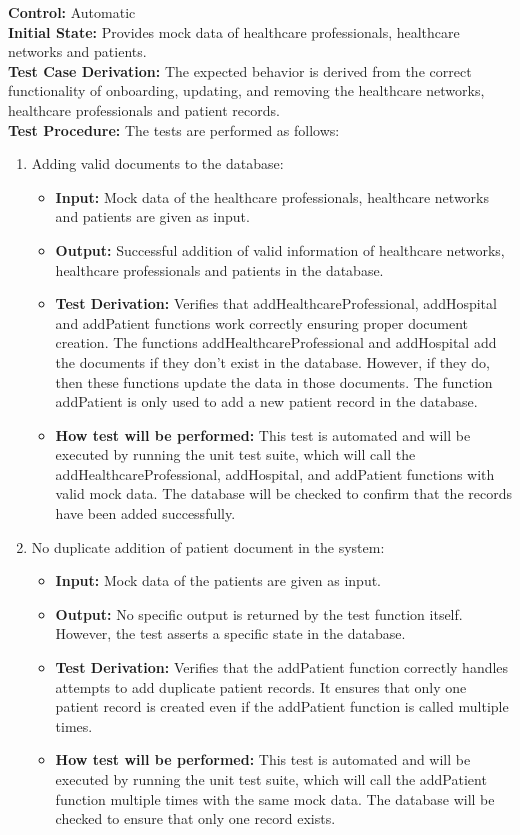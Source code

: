 \documentclass[12pt, titlepage]{article}
\begin{document}
\textbf{Control:} Automatic\\ 
\textbf{Initial State:} Provides mock data of healthcare professionals, healthcare networks and patients.\\ 
 \textbf{Test Case Derivation:} The expected behavior is derived from the correct functionality of onboarding, updating, and removing the healthcare networks, healthcare professionals and patient records.\\ 
\textbf{Test Procedure:} The tests are performed as follows:
\begin{enumerate}
  \item Adding valid documents to the database:
    \begin{itemize}
      \item \textbf{Input:} Mock data of the healthcare professionals, healthcare networks and patients are given as input.  
      \item \textbf{Output:} Successful addition of valid information of healthcare networks, healthcare professionals and patients in the database. 
      \item \textbf{Test Derivation:} Verifies that addHealthcareProfessional, addHospital and addPatient functions work correctly ensuring proper document creation. The functions addHealthcareProfessional and addHospital add the documents if they don't exist in the database. However, if they do, then these functions update the data in those documents. The function addPatient is only used to add a new patient record in the database.
      \item \textbf{How test will be performed:} This test is automated and will be executed by running the unit test suite, which will call the addHealthcareProfessional, addHospital, and addPatient functions with valid mock data. The database will be checked to confirm that the records have been added successfully.
    \end{itemize}

  \item No duplicate addition of patient document in the system:
    \begin{itemize}
      \item \textbf{Input:} Mock data of the patients are given as input.  
      \item \textbf{Output:} No specific output is returned by the test function itself. However, the test asserts a specific state in the database. 
      \item \textbf{Test Derivation:} Verifies that the addPatient function correctly handles attempts to add duplicate patient records. It ensures that only one patient record is created even if the addPatient function is called multiple times.
      \item \textbf{How test will be performed:} This test is automated and will be executed by running the unit test suite, which will call the addPatient function multiple times with the same mock data. The database will be checked to ensure that only one record exists.
    \end{itemize}


\end{enumerate}
\end{document}
